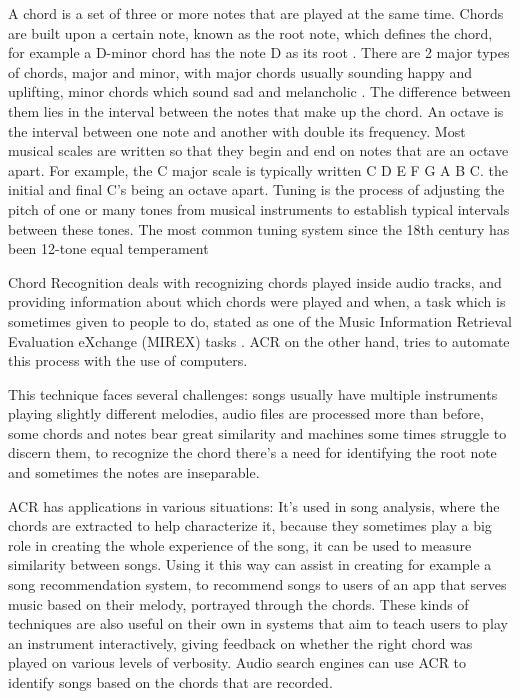 \documentclass[a4paper]{article}
\begin{document}
A chord is a set of three or more notes that are played at the same time. Chords are built upon a certain note, known as the root note, which defines the chord, for example a D-minor chord has the note D as its root \citep{chord_wiki}. There are 2 major types of chords, major and minor, with major chords usually sounding happy and uplifting, minor chords which sound sad and melancholic \citep{musictheory_wiki}. The difference between them lies in the interval between the notes that make up the chord.
An octave is the interval between one note and another with double its frequency.
Most musical scales are written so that they begin and end on notes that are an octave apart. For example, the C major scale is typically written C D E F G A B C. the initial and final C's being an octave apart.
Tuning is the process of adjusting the pitch of one or many tones from musical instruments to establish typical intervals between these tones. 
The most common tuning system since the 18th century has been 12-tone equal temperament

Chord Recognition deals with recognizing chords played inside audio tracks, and providing information about which chords were played and when, a task which is sometimes given to people to do, stated as one of the Music Information Retrieval Evaluation eXchange (MIREX) tasks \cite{mirex}.
ACR on the other hand, tries to automate this process with the use of computers.

This technique faces several challenges: songs usually have multiple instruments playing slightly different melodies, audio files are processed more than before, some chords and notes bear great similarity and machines some times struggle to discern them, to recognize the chord there's a need for identifying the root note and sometimes the notes are inseparable.

ACR has applications in various situations:
It's used in song analysis, where the chords are extracted to help characterize it, because they sometimes play a big role in creating the whole experience of the song, it can be used to measure similarity between songs. Using it this way can assist in creating for example a song recommendation system, to recommend songs to users of an app that serves music based on their melody, portrayed through the chords.
These kinds of techniques are also useful on their own in systems that aim to teach users to play an instrument interactively, giving feedback on whether the right chord was played on various levels of verbosity. Audio search engines can use ACR to identify songs based on the chords that are recorded.
\end{document}
